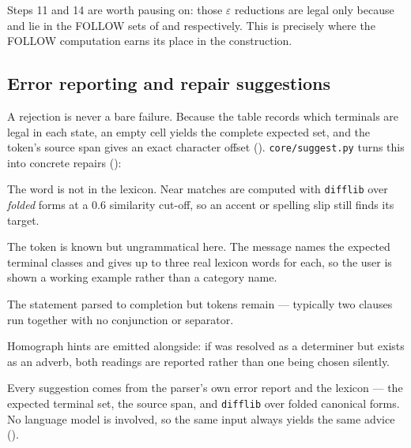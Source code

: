 Steps 11 and 14 are worth pausing on: those $\varepsilon$ reductions are legal only because
 and  lie in the FOLLOW sets of  and
 respectively. This is precisely where the FOLLOW computation earns its
place in the construction.

\subsection{Error reporting and repair suggestions}

A rejection is never a bare failure. Because the table records which terminals are legal
in each state, an empty cell yields the complete expected set, and the token's source span
gives an exact character offset (). \texttt{core/suggest.py} turns this into
concrete repairs ():

\begin{description}[leftmargin=1.4em, style=nextline, font=\ttfamily]
  \item[unknown\_word]
    The word is not in the lexicon. Near matches are computed with \texttt{difflib} over
    \emph{folded} forms at a 0.6 similarity cut-off, so an accent or spelling slip still
    finds its target.
  \item[unexpected\_token]
    The token is known but ungrammatical here. The message names the expected terminal
    classes and gives up to three real lexicon words for each, so the user is shown a
    working example rather than a category name.
  \item[trailing\_input]
    The statement parsed to completion but tokens remain --- typically two clauses run
    together with no conjunction or separator.
\end{description}

Homograph hints are emitted alongside: if  was resolved as a determiner but 
exists as an adverb, both readings are reported rather than one being chosen silently.

\begin{keypoint}
Every suggestion comes from the parser's own error report and the lexicon --- the expected
terminal set, the source span, and \texttt{difflib} over folded canonical forms. No
language model is involved, so the same input always yields the same advice
().
\end{keypoint}
